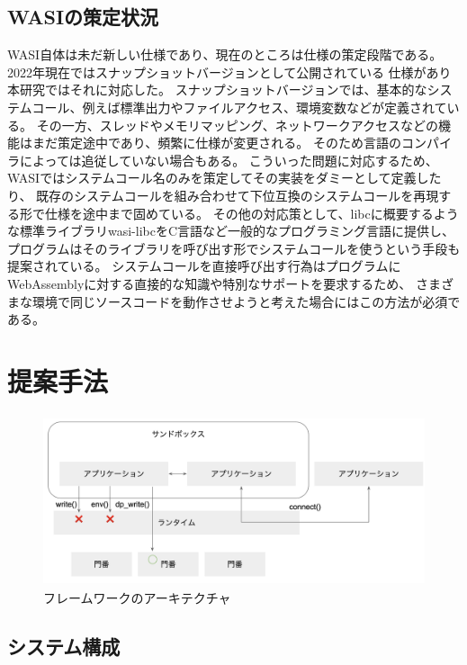 \documentclass[a4paper,11pt]{jreport}
\begin{document}
\section{WASIの策定状況}

WASI自体は未だ新しい仕様であり、現在のところは仕様の策定段階である。2022年現在ではスナップショットバージョンとして公開されている
仕様があり本研究ではそれに対応した。
スナップショットバージョンでは、基本的なシステムコール、例えば標準出力やファイルアクセス、環境変数などが定義されている。
その一方、スレッドやメモリマッピング、ネットワークアクセスなどの機能はまだ策定途中であり、頻繁に仕様が変更される。
そのため言語のコンパイラによっては追従していない場合もある。
こういった問題に対応するため、WASIではシステムコール名のみを策定してその実装をダミーとして定義したり\cite{wasi-pr-thread}、
既存のシステムコールを組み合わせて下位互換のシステムコールを再現する形\cite{wasi-issue-thread}で仕様を途中まで固めている。
その他の対応策として、libcに概要するような標準ライブラリwasi-libcをC言語など一般的なプログラミング言語に提供し、
プログラムはそのライブラリを呼び出す形でシステムコールを使うという手段も提案されている。
システムコールを直接呼び出す行為はプログラムにWebAssemblyに対する直接的な知識や特別なサポートを要求するため、
さまざまな環境で同じソースコードを動作させようと考えた場合にはこの方法が必須である。

\chapter{提案手法}

\begin{figure}[htbp]
    \centering
\includegraphics[height=50mm]{architecture.png}
    \caption{フレームワークのアーキテクチャ}
    \label{fig:architecture}
\end{figure}

\section{システム構成}
\end{document}
